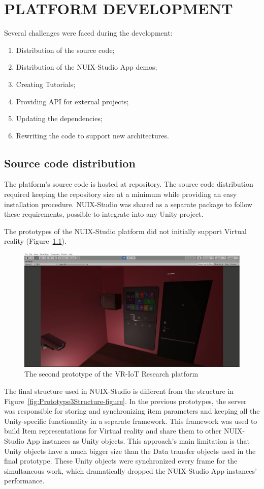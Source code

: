 
\chapter{PLATFORM DEVELOPMENT}

Several challenges were faced during the development:
\begin{enumerate}
    \item Distribution of the source code;
    \item Distribution of the NUIX-Studio App demos;
    \item Creating Tutorials;
    \item Providing API for external projects;
    \item Updating the dependencies;
    \item Rewriting the code to support new architectures.
\end{enumerate}

\section{Source code distribution}

The platform's source code is hosted at \cite{NUIXStudio} repository. The source code distribution required keeping the repository size at a minimum while providing an easy installation procedure. NUIX-Studio was shared as a separate package to follow these requirements, possible to integrate into any Unity project.


The prototypes of the NUIX-Studio platform did not initially support Virtual reality (Figure~\ref{fig:Prototype2-figure}).


\begin{figure}
  \centering
  \includegraphics[width=0.6\linewidth]{figures/Prototype2.png}
  \caption{The second prototype of the VR-IoT Research platform}
  \label{fig:Prototype2-figure}
\end{figure}

The final structure used in NUIX-Studio is different from the structure in Figure~\ref{fig:Prototype3Structure-figure}. In the previous prototypes, the server was responsible for storing and synchronizing item parameters and keeping all the Unity-specific functionality in a separate framework. This framework was used to build Item representations for Virtual reality and share them to other NUIX-Studio App instances as Unity objects. This approach's main limitation is that Unity objects have a much bigger size than the Data transfer objects used in the final prototype. These Unity objects were synchronized every frame for the simultaneous work, which dramatically dropped the NUIX-Studio App instances' performance.

